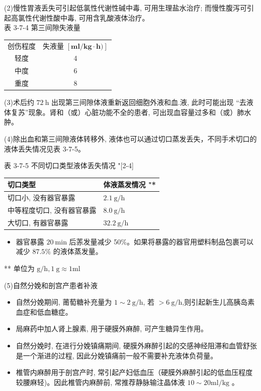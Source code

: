 \documentclass[10pt]{article}
\begin{document}
(2)慢性胃液丢失可引起低氯性代谢性碱中毒, 可用生理盐水治疗; 而慢性腹泻可引起高氯性代谢性酸中毒, 可用含乳酸液体治疗。\\
表 3-7-4 第三间隙失液量

\begin{center}
\begin{tabular}{cc}
\hline
创伤程度 & 失液量 $[\mathbf{m l} / \mathbf{k g} \cdot \mathbf{h})]$ \\
轻度 & 4 \\
中度 & 6 \\
重度 & 8 \\
\hline
\end{tabular}
\end{center}

(3)术后约 $72 \mathrm{~h}$ 出现第三间隙体液重新返回细胞外液和血.液, 此时可能出现 “去液体复苏”现象。肾和（或）心脏功能不全的患者, 可出现血容量过多和（或）肺水肿。

(4)除出血和第三间隙液体转移外, 液体也可以通过切口蒸发丢失，不同手术切口的液体丢失情况见表 3-7-5。

表 3-7-5 不同切口类型液体丢失情况 "[2-4]

\begin{center}
\begin{tabular}{ll}
切口类型 & 体液蒸发情况 "* \\
\hline
切口小, 没有器官暴露 & $2.1 \mathrm{~g} / \mathrm{h}$ \\
中等程度切口, 没有器官暴露 & $8.0 \mathrm{~g} / \mathrm{h}$ \\
大切口, 有器官暴露 & $32.2 \mathrm{~g} / \mathrm{h}$ \\
\hline
\end{tabular}
\end{center}

\begin{itemize}
  \item 器官暴露 $20 \mathrm{~min}$ 后䓇发量减少 50\%。如果将暴露的器官用塑料制品包裹可以减少 $87.5 \%$ 的液体蒸发量。
\end{itemize}

** 单位为 $\mathrm{g} / \mathrm{h}, 1 \mathrm{~g} \approx 1 \mathrm{ml}$

(5)自然分娩和剖宫产患者补液

\begin{itemize}
  \item 自然分娩期间, 莆萄糖补充量为 $1 \sim 2 \mathrm{~g} / \mathrm{h}$, 若 $>6 \mathrm{~g} / \mathrm{h}$,则引起新生儿高胰岛素血症和低血糖症。
  \item 局麻药中加人肾上腺素, 用于硬膜外麻醉, 可产生糖异生作用。
  \item 自然分娩时, 在进行分娩镇痛期间, 硬膜外麻醉引起的交感神经阻滞和血管舒张是一个渐进的过程, 因此分娩镇痛前一般不需要补充液体负荷量。
  \item 椎管内麻醉用于剖宫产时, 常引起产妇低血压（硬膜外麻醉引起的低血压程度较腰麻轻)。因此椎管内麻醉前, 常推荐静脉输注晶体液 $10 \sim 20 \mathrm{ml} / \mathrm{kg}$ 。
\end{itemize}
\end{document}
